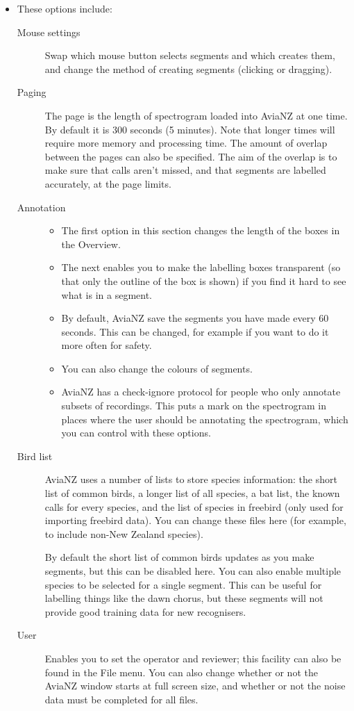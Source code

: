 \documentclass{article}
\begin{document}
\begin{itemize}
\item These options include:
\begin{description}
\item[Mouse settings] Swap which mouse button selects segments and which creates them, and change the method of creating segments (clicking or dragging).
\item[Paging] The page is the length of spectrogram loaded into AviaNZ at one time. By default it is 300 seconds (5 minutes). Note that longer times will require more memory and processing time. The amount of overlap between the pages can also be specified. The aim of the overlap is to make sure that calls aren't missed, and that segments are labelled accurately, at the page limits. 
\item[Annotation] 
\begin{itemize}
\item The first option in this section changes the length of the boxes in the Overview. 
\item The next enables you to make the labelling boxes transparent (so that only the outline of the box is shown) if you find it hard to see what is in a segment. 
\item By default, AviaNZ save the segments you have made every 60 seconds. This can be changed, for example if you want to do it more often for safety. 
\item You can also change the colours of segments.
\item AviaNZ has a check-ignore protocol for people who only annotate subsets of recordings. This puts a mark on the spectrogram in places where the user should be annotating the spectrogram, which you can control with these options.
\end{itemize}
\item[Bird list] AviaNZ uses a number of lists to store species information: the short list of common birds, a longer list of all species, a bat list, the known calls for every species, and the list of species in freebird (only used for importing freebird data). You can change these files here (for example, to include non-New Zealand species). %

By default the short list of common birds updates as you make segments, but this can be disabled here. You can also enable multiple species to be selected for a single segment. This can be useful for labelling things like the dawn chorus, but these segments will not provide good training data for new recognisers. 
\item[User] Enables you to set the operator and reviewer; this facility can also be found in the File menu. You can also change whether or not the AviaNZ window starts at full screen size, and whether or not the noise data must be completed for all files. 
\end{description}
\end{itemize}
\end{document}
